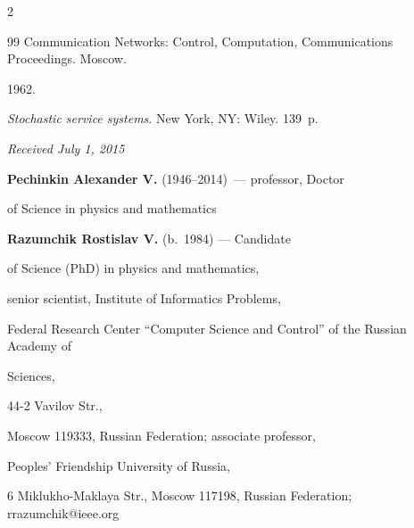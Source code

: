 \begin{multicols}{2}
{{\begin{thebibliography}{99}
{Communication Networks: Control, Computation, Communications Proceedings}. Moscow. 







 1962.


\textit{Stochastic service systems}. New York, NY: Wiley. 139~p.


\end{thebibliography}





 }


 }





\end{multicols}





\vspace*{-3pt}





\hfill{\small\textit{Received July 1, 2015}}








\Contr





\noindent


\textbf{Pechinkin Alexander V.} (1946--2014)~--- professor, Doctor


of Science in physics and mathematics





\vspace*{3pt}





\noindent


\textbf{Razumchik Rostislav V.} (b.\ 1984) --- Candidate


of Science (PhD) in physics and mathematics,


senior scientist, Institute of Informatics Problems, 


Federal Research Center ``Computer Science and Control'' of the Russian Academy of 


Sciences,


44-2 Vavilov Str.,


Moscow 119333, Russian Federation; associate professor,


Peoples' Friendship University of Russia,


6 Miklukho-Maklaya Str., Moscow 117198, Russian Federation; rrazumchik@ieee.org








\label{end\stat}








\renewcommand{\bibname}{\protect\rm Литература}



